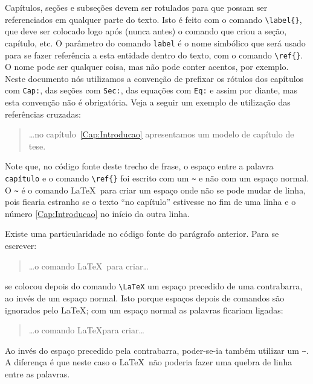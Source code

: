Capítulos, seções e subseções devem ser rotulados para que possam ser
referenciados em qualquer parte do texto.  Isto é feito com o comando
\verb|\label{}|, que deve ser colocado logo após (nunca antes) o
comando que criou a seção, capítulo, etc. O parâmetro do comando
\texttt{label} é o nome simbólico que será usado para se fazer
referência a esta entidade dentro do texto, com o comando
\verb|\ref{}|. O nome pode ser qualquer coisa, mas não pode conter
acentos, por exemplo. Neste documento nós utilizamos a convenção de
prefixar os rótulos dos capítulos com \texttt{Cap:}, das seções com
\texttt{Sec:}, das equações com \texttt{Eq:} e assim por diante, mas
esta convenção não é obrigatória. Veja a seguir um exemplo de
utilização das referências cruzadas:
\begin{quotation}
\dots no capítulo~\ref{Cap:Introducao} apresentamos um modelo de
capítulo de tese.
\end{quotation}
Note que, no código fonte deste trecho de frase, o espaço entre a palavra
\texttt{capítulo} e o comando \verb|\ref{}| foi escrito com
um \texttt{\~{}} e não com um espaço normal. O \texttt{\~{}} é o
comando \LaTeX\ para criar um espaço onde não se pode mudar de linha,
pois ficaria estranho se o texto ``no capítulo'' estivesse no fim de
uma linha e o número \ref{Cap:Introducao} no início da outra linha.

Existe uma particularidade no código fonte do parágrafo anterior. Para
se escrever:
\begin{quotation}
\dots o comando \LaTeX\ para criar\dots
\end{quotation}
se colocou depois do comando \verb|\LaTeX| um espaço
precedido de uma contrabarra, ao invés de um espaço normal. Isto porque
espaços depois de comandos são ignorados pelo \LaTeX; com um espaço
normal as palavras ficariam ligadas:
\begin{quotation}
\dots o comando \LaTeX para criar\dots
\end{quotation}
Ao invés do espaço precedido pela contrabarra, poder-se-ia também
utilizar um \texttt{\~{}}. A diferença é que neste caso o \LaTeX\ não
poderia fazer uma quebra de linha entre as palavras.
